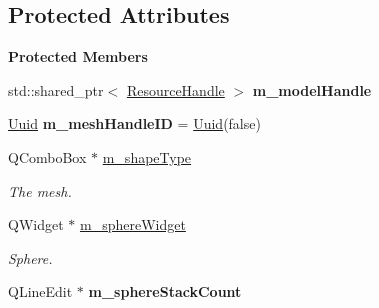 \subsection*{Protected Attributes}
\begin{Indent}\textbf{ Protected Members}\par
\begin{DoxyCompactItemize}
\item 
\mbox{\label{classrev_1_1_view_1_1_create_mesh_widget_af0e6c3abd47ee92a5bc89106facfd66d}} 
std\+::shared\+\_\+ptr$<$ \mbox{\hyperlink{classrev_1_1_resource_handle}{Resource\+Handle}} $>$ {\bfseries m\+\_\+model\+Handle}
\item 
\mbox{\label{classrev_1_1_view_1_1_create_mesh_widget_aba29d9b2c0faca7e050424a99dd709a4}} 
\mbox{\hyperlink{classrev_1_1_uuid}{Uuid}} {\bfseries m\+\_\+mesh\+Handle\+ID} = \mbox{\hyperlink{classrev_1_1_uuid}{Uuid}}(false)
\item 
\mbox{\label{classrev_1_1_view_1_1_create_mesh_widget_aaa7594defb90f7701a95f510b1ee6553}} 
Q\+Combo\+Box $\ast$ \mbox{\hyperlink{classrev_1_1_view_1_1_create_mesh_widget_aaa7594defb90f7701a95f510b1ee6553}{m\+\_\+shape\+Type}}
\begin{DoxyCompactList}\small\item\em The mesh. \end{DoxyCompactList}\item 
\mbox{\label{classrev_1_1_view_1_1_create_mesh_widget_a5f79d1752753c6569f32882dc9171539}} 
Q\+Widget $\ast$ \mbox{\hyperlink{classrev_1_1_view_1_1_create_mesh_widget_a5f79d1752753c6569f32882dc9171539}{m\+\_\+sphere\+Widget}}
\begin{DoxyCompactList}\small\item\em Sphere. \end{DoxyCompactList}\item 
\mbox{\label{classrev_1_1_view_1_1_create_mesh_widget_a2a3aae4dad3e566bbb9d11f17f9d5177}} 
Q\+Line\+Edit $\ast$ {\bfseries m\+\_\+sphere\+Stack\+Count}
\item 
\mbox{\label{classrev_1_1_view_1_1_create_mesh_widget_a29caa5ef93e7c27973e99a20761b5793}} 

\end{DoxyCompactItemize}
\end{Indent}
